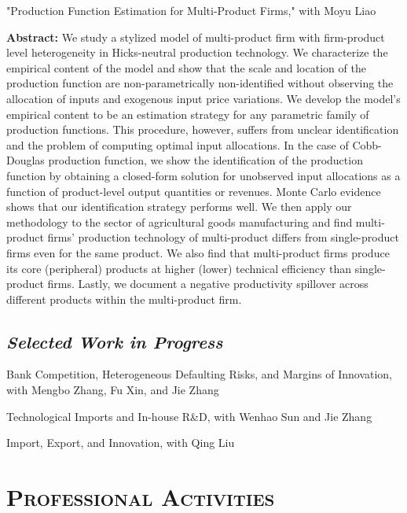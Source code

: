 \documentclass[letterpaper]{article}
\begin{document}
    
 \vspace{0.05in}  
 "Production Function Estimation for Multi-Product Firms," with Moyu Liao
     \vspace{0.05in}
 \begin{center}
 \begin{minipage}{0.9\linewidth}
   \textbf{Abstract:} We study a stylized model of multi-product firm with firm-product level heterogeneity in Hicks-neutral production technology. We characterize the empirical content of the model and show that the scale and location of the production function are non-parametrically non-identified without observing the allocation of inputs and exogenous input price variations. We develop the model's empirical content to be an estimation strategy for any parametric family of production functions. This procedure, however, suffers from unclear identification and the problem of computing optimal input allocations. In the case of Cobb-Douglas production function, we show the identification of the production function by obtaining a closed-form solution for unobserved input allocations as a function of product-level output quantities or revenues. Monte Carlo evidence shows that our identification strategy performs well. We then apply our methodology to the sector of agricultural goods manufacturing and find multi-product firms' production technology of multi-product differs from single-product firms even for the same product. We also find that multi-product firms produce its core (peripheral) products at higher (lower) technical efficiency than single-product firms. Lastly, we document a negative productivity spillover across different products within the multi-product firm.
 \end{minipage}
 \end{center}

\subsection*{\textit{Selected Work in Progress}}
 Bank Competition, Heterogeneous Defaulting Risks, and Margins of Innovation, with Mengbo Zhang, Fu Xin, and Jie Zhang 
 
 \vspace{0.5em}
Technological Imports and In-house R\&D, with Wenhao Sun and Jie Zhang
 
 \vspace{0.5em}
Import, Export, and Innovation, with Qing Liu 

\section*{\textsc{Professional Activities}}
\end{document}
